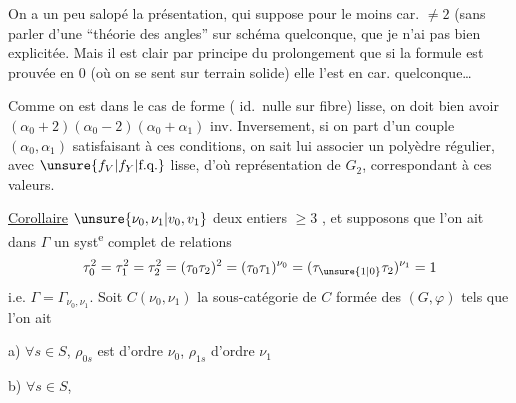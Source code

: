 On a un peu salopé la présentation,  qui suppose
pour le moins  car.  $\ne2$ (sans parler d'une
``théorie des angles'' sur schéma quelconque, que je
n'ai pas bien explicitée. Mais il est clair par
principe du prolongement que si la formule  est
prouvée en  $0$ (où on se sent sur terrain
solide) elle l'est en car. quelconque\ldots

Comme on est dans le cas de forme  (
id.\ nulle sur  fibre) lisse, on doit bien avoir
$(\alpha_0+2)(\alpha_0-2)(\alpha_0+\alpha_1)$ inv. Inversement, si on part
d'un couple $(\alpha_0,\alpha_1)$ satisfaisant à ces conditions,
on sait lui associer un polyèdre régulier,
avec $\unsure{f_V|f_Y|\text{f.q.}}$ lisse, d'où représentation de $G_2$, correspondant
à ces valeurs. 

\uline{Corollaire}  $\unsure{\nu_0,\nu_1|v_0,v_1}$ deux entiers $\geq3$ , et supposons
que l'on ait dans $\Gamma$ un syst\textsuperscript{e} complet de
relations
\[\tau_0^2=\tau_1^2=\tau_2^2=(\tau_0\tau_2)^2=(\tau_0\tau_1)^{\nu_0}=(\tau_{\unsure{1|0}}\tau_2)^{\nu_1}=1\]
i.e. $\Gamma=\Gamma_{\nu_0,\nu_1}$.
 Soit  $C(\nu_0,\nu_1)$
la sous-catégorie de $C$ formée des
$(G,\varphi)$  tels que l'on ait

a) $\forall s\in S$, $\rho_{0s}$ est d'ordre $\nu_0$, $\rho_{1s}$ d'ordre $\nu_1$ \uline{}

b) $\forall s\in S$,  

